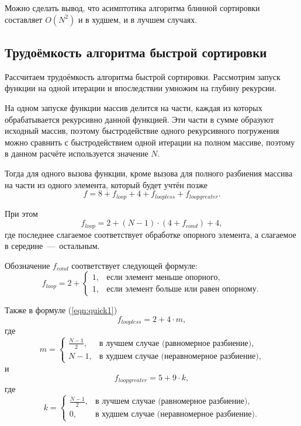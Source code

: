 Можно сделать вывод, что асимптотика алгоритма блинной сортировки составляет $O(N^2)$ и в худшем, и в лучшем случаях.

\subsection{Трудоёмкость алгоритма быстрой сортировки}
Рассчитаем трудоёмкость алгоритма быстрой сортировки. Рассмотрим запуск функции на одной итерации и впоследствии умножим на глубину рекурсии. 

На одном запуске функции массив делится на части, каждая из которых обрабатывается рекурсивно данной функцией. Эти части в сумме образуют исходный массив, поэтому быстродействие одного рекурсивного погружения можно сравнить с быстродействием одной итерации на полном массиве, поэтому в данном расчёте используется значение $N$.

Тогда для одного вызова функции, кроме вызова для полного разбиения массива на части из одного элемента, который будет учтён позже
\begin{equation} \label{eqn:quick1}
	f = 8 + f_{loop} + 4 + f_{loopless} + f_{loopgreater}.
\end{equation}

При этом
\begin{equation}
	f_{loop} = 2 + (N - 1) \cdot (4 + f_{cond}) + 4,
\end{equation}
где последнее слагаемое соответствует обработке опорного элемента, а слагаемое в середине~---~остальным.

Обозначение $f_{cond}$ соответствует следующей формуле:
\begin{equation}
	f_{loop} = 2 + \begin{cases}
	1,& \text{если элемент меньше опорного}, \\
	1,& \text{если элемент больше или равен опорному}.
\end{cases}
\end{equation}

Также в формуле (\ref{eqn:quick1})
\begin{equation}
	f_{loopless} = 2 + 4 \cdot m,
\end{equation}
где 
\begin{equation}
	m = \begin{cases}
	\frac{N - 1}{2},& \text{в лучшем случае (равномерное разбиение)}, \\
	N - 1,& \text{в худшем случае (неравномерное разбиение)},
\end{cases}
\end{equation}
и
\begin{equation}
	f_{loopgreater} = 5 + 9 \cdot k,
\end{equation}
где 
\begin{equation}
	k = \begin{cases}
	\frac{N - 1}{2},& \text{в лучшем случае (равномерное разбиение)}, \\
	0,& \text{в худшем случае (неравномерное разбиение)}.
\end{cases}
\end{equation}

